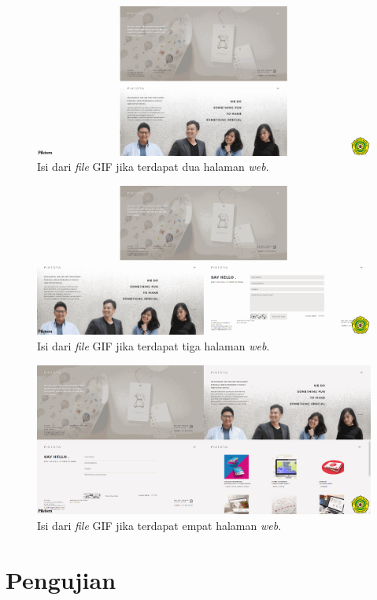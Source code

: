 \begin{enumerate}
\begin{figure}[H]
	\centering
		\includegraphics[scale=0.4]{Gambar/output2.png}
	\caption{Isi dari \textit{file} GIF jika terdapat dua halaman \textit{web}.}
	\label{fig:gif2}
\end{figure}

\begin{figure}[H]
	\centering
		\includegraphics[scale=0.4]{Gambar/output3.png}
	\caption{Isi dari \textit{file} GIF jika terdapat tiga halaman \textit{web}.}
	\label{fig:gif3}
\end{figure}

\begin{figure}[H]
	\centering
		\includegraphics[scale=0.4]{Gambar/output4.png}
	\caption{Isi dari \textit{file} GIF jika terdapat empat halaman \textit{web}.}
	\label{fig:gif4}
\end{figure}

\end{enumerate}
\section{Pengujian}
\label{sec:pengujian}

